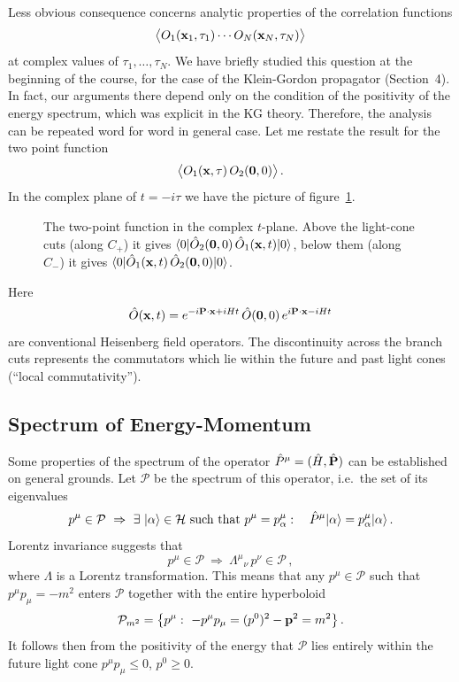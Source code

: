 Less obvious consequence concerns analytic properties of the correlation functions
\[
\bigl\langle O_1(\mathbf{x}_1,\tau_1)\cdots O_N(\mathbf{x}_N,\tau_N)\bigr\rangle
\]
at complex values of $\tau_1,\dots,\tau_N$. We have briefly studied this question at
the beginning of the course, for the case of the Klein-Gordon propagator
(Section~4). In fact, our arguments there depend only on the condition of the
positivity of the energy spectrum, which was explicit in the KG theory. Therefore,
the analysis can be repeated word for word in general case. Let me restate the
result for the two point function
\[
\bigl\langle O_1(\mathbf{x},\tau)\,O_2(\mathbf0,0)\bigr\rangle\,.
\]
In the complex plane of $t=-i\tau$ we have the picture of
figure~\ref{fig:tcontours2}.
\begin{figure}[ht]
\centering{}
\caption{The two-point function in the complex $t$-plane. Above the light-cone
cuts (along $C_+$) it gives $\langle 0|\hat O_2(\mathbf0,0)\,\hat O_1(\mathbf{x},t)|0\rangle$,
below them (along $C_-$) it gives $\langle 0|\hat O_1(\mathbf{x},t)\,\hat O_2(\mathbf0,0)|0\rangle$.}
\label{fig:tcontours2}
\end{figure}
Here
\[
\hat O(\mathbf{x},t)=e^{-i\mathbf{P}\cdot\mathbf{x}+iHt}\,\hat O(\mathbf0,0)\,e^{i\mathbf{P}\cdot\mathbf{x}-iHt}
\]
are conventional Heisenberg field operators. The discontinuity across the branch
cuts represents the commutators which lie within the future and past light cones
(``local commutativity'').

\subsection*{Spectrum of Energy-Momentum}

Some properties of the spectrum of the operator $\hat P^\mu=(\hat H,\hat{\mathbf{P}})$ can
be established on general grounds. Let $\mathcal P$ be the spectrum of this
operator, i.e.\ the set of its eigenvalues
\[
p^\mu\in\mathcal P\ \Rightarrow\ \exists\ \ket\alpha\in\Ham\ \text{such that}\ p^\mu=p^\mu_\alpha:\quad\hat P^\mu\ket\alpha=p^\mu_\alpha\ket\alpha\,.
\]
Lorentz invariance suggests that
\[
p^\mu\in\mathcal P\ \Rightarrow\ \Lambda^\mu{}_\nu\,p^\nu\in\mathcal P\,,
\]
where $\Lambda$ is a Lorentz transformation. This means that any $p^\mu\in\mathcal P$
such that $p^\mu p_\mu=-m^2$ enters $\mathcal P$ together with the entire hyperboloid
\[
\mathcal P_{m^2}=\bigl\{p^\mu:\ -p^\mu p_\mu=(p^0)^2-\mathbf{p}^2=m^2\bigr\}\,.
\]
It follows then from the positivity of the energy that $\mathcal P$ lies entirely
within the future light cone $p^\mu p_\mu\le0$, $p^0\ge0$.

